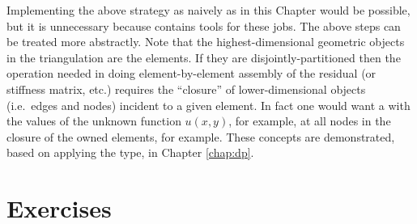 Implementing the above strategy as naively as in this Chapter would be possible, but it is unnecessary because \PETSc contains tools for these jobs.  The above steps can be treated more abstractly.  Note that the highest-dimensional geometric objects in the triangulation are the elements.  If they are disjointly-partitioned then the operation needed in doing element-by-element assembly of the residual (or stiffness matrix, etc.) requires the ``closure'' of lower-dimensional objects (i.e.~edges and nodes) incident to a given element.  In fact one would want a \pVec with the values of the unknown function $u(x,y)$, for example, at all nodes in the closure of the owned elements, for example.  These concepts are demonstrated, based on applying the \pDMPlex type, in Chapter \ref{chap:dp}.


\section{Exercises}


